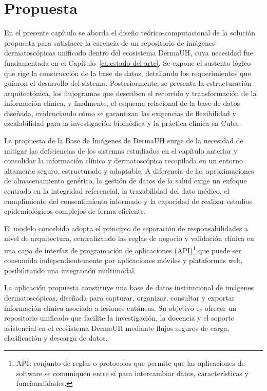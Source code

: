 \chapter{Propuesta}\label{ch:proposal}

En el presente capítulo se aborda el diseño teórico-computacional de la solución propuesta para satisfacer la 
carencia de un repositorio de imágenes dermatoscópicas unificado dentro del ecosistema DermaUH, cuya 
necesidad fue fundamentada en el Capítulo~\ref{ch:estado-del-arte}. Se expone 
el sustento lógico que rige la construcción de la base de datos, detallando los requerimientos que guiaron 
el desarrollo del sistema. Posteriormente, se presenta la estructuración arquitectónica, los flujogramas 
que describen el recorrido y transformación de la información clínica, y finalmente, el esquema relacional 
de la base de datos diseñada, evidenciando cómo se garantizan las exigencias de flexibilidad y 
escalabilidad para la investigación biomédica y la práctica clínica en Cuba.

La propuesta de la Base de Imágenes de DermaUH surge de la necesidad de mitigar las deficiencias de los sistemas
estudiados en el capítulo anterior y consolidar la información clínica y dermatoscópica recopilada en un 
entorno altamente seguro, estructurado y adaptable. A diferencia de las 
aproximaciones de almacenamiento genérico, la gestión de datos de la salud exige un enfoque centrado en 
la integridad referencial, la trazabilidad del dato médico, el cumplimiento del consentimiento informado 
y la capacidad de realizar estudios epidemiológicos complejos de forma eficiente. 

El modelo concebido adopta el principio de separación de responsabilidades a nivel de arquitectura, 
centralizando las reglas de negocio y validación clínica en una capa de interfaz de programación de 
aplicaciones (API)\footnote{API: conjunto de reglas o protocolos que permite que las aplicaciones de 
software se comuniquen entre sí para intercambiar datos, características y funcionalidades.} 
que puede ser consumida independientemente por aplicaciones móviles y plataformas 
web, posibilitando una integración multimodal.

La aplicación propuesta constituye una base de datos institucional de imágenes dermatoscópicas, diseñada 
para capturar, organizar, consultar y exportar información clínica asociada a lesiones cutáneas. Su 
objetivo es ofrecer un repositorio unificado que facilite la investigación, la docencia y el soporte 
asistencial en el ecosistema DermaUH mediante flujos seguros de carga, clasificación y descarga de datos.

